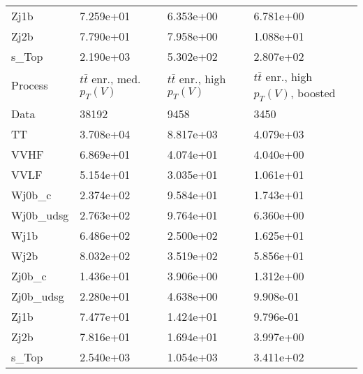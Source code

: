 \begin{table}
{\begin{tabularx}{0.8\textwidth}{|X|X|X|X|}
Zj1b & 7.259e+01 & 6.353e+00 & 6.781e+00 \\
Zj2b & 7.790e+01 & 7.958e+00 & 1.088e+01 \\
s\_Top & 2.190e+03 & 5.302e+02 & 2.807e+02 \\
\hline
\hline
Process & $t\bar{t}$ enr., med. $p_{T}(V)$ & $t\bar{t}$ enr., high $p_{T}(V)$ & $t\bar{t}$ enr., high $p_{T}(V)$, boosted \\
\hline
Data & 38192 & 9458 & 3450 \\
\hline
TT & 3.708e+04 & 8.817e+03 & 4.079e+03 \\
VVHF & 6.869e+01 & 4.074e+01 & 4.040e+00 \\
VVLF & 5.154e+01 & 3.035e+01 & 1.061e+01 \\
Wj0b\_c & 2.374e+02 & 9.584e+01 & 1.743e+01 \\
Wj0b\_udsg & 2.763e+02 & 9.764e+01 & 6.360e+00 \\
Wj1b & 6.486e+02 & 2.500e+02 & 1.625e+01 \\
Wj2b & 8.032e+02 & 3.519e+02 & 5.856e+01 \\
Zj0b\_c & 1.436e+01 & 3.906e+00 & 1.312e+00 \\
Zj0b\_udsg & 2.280e+01 & 4.638e+00 & 9.908e-01 \\
Zj1b & 7.477e+01 & 1.424e+01 & 9.796e-01 \\
Zj2b & 7.816e+01 & 1.694e+01 & 3.997e+00 \\
s\_Top & 2.540e+03 & 1.054e+03 & 3.411e+02 \\
\hline
\end{tabularx}
}
\label{tab:cr-Wen-2016}
\end{table}

